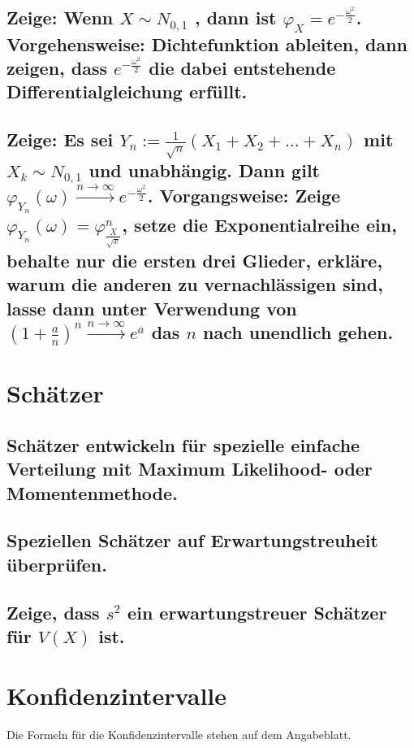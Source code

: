 \documentclass[a4paper,10pt]{article}
\begin{document}
\subsection{Zeige: Wenn $X \sim N_{0,1}$ , dann ist $\varphi_X = e^{- \frac{\omega^2}{2}}$. Vorgehensweise: Dichtefunktion ableiten, dann zeigen, dass $e^{- \frac{\omega^2}{2}}$ die dabei entstehende Differentialgleichung erfüllt.}

\subsection{Zeige: Es sei $Y_n:= \frac{1}{\sqrt{n}} (X_1 + X_2 + . . . + X_n)$ mit $X_k \sim N_{0,1}$ und unabhängig. Dann gilt $\varphi_{Y_{n}}(\omega)\xrightarrow{n\rightarrow \infty} e^{- \frac{\omega^2}{2}}$. Vorgangsweise: Zeige $\varphi_{Y_{n}}(\omega) = \varphi^{n}_{\frac{X}{\sqrt{x}}}$, setze die Exponentialreihe ein, behalte nur die ersten drei Glieder, erkläre, warum die anderen zu vernachlässigen sind, lasse dann unter Verwendung von $(1 + \frac{a}{n})^n \xrightarrow{n\rightarrow \infty} e^a$ das $n$ nach unendlich gehen.}

\newpage
\section{Schätzer}
\subsection{Schätzer entwickeln für spezielle einfache Verteilung mit Maximum Likelihood- oder Momentenmethode.}

\subsection{Speziellen Schätzer auf Erwartungstreuheit überprüfen.}

\subsection{Zeige, dass $s^2$ ein erwartungstreuer Schätzer für $V(X)$ ist.}

\newpage
\section{Konfidenzintervalle}
Die Formeln für die Konfidenzintervalle stehen auf dem Angabeblatt.
\end{document}
